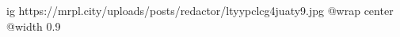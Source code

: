  
 
 
 
 

\ifcmt
  ig https://mrpl.city/uploads/posts/redactor/ltyypclcg4juaty9.jpg
  @wrap center
  @width 0.9
\fi
